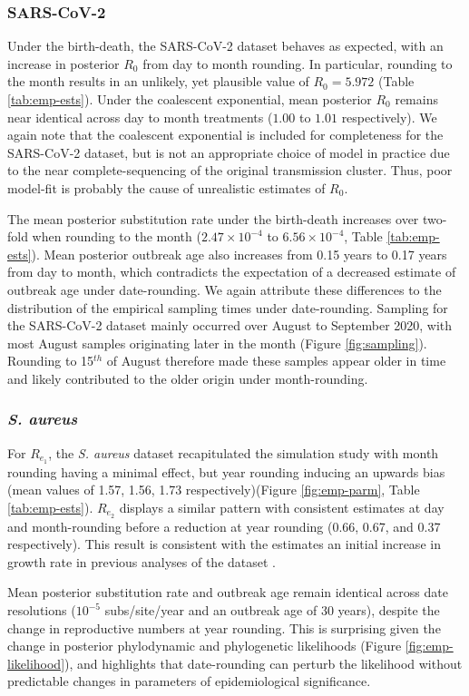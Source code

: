 \documentclass[12pt]{article}
\begin{document}
\begin{spacing}{2}
\subsubsection*{SARS-CoV-2}
Under the birth-death, the SARS-CoV-2 dataset behaves as expected, with an increase in posterior $R_0$ from day to month rounding. In particular, rounding to the month results in an unlikely, yet plausible value of $R_0 = 5.972$ (Table \ref{tab:emp-ests}). Under the coalescent exponential, mean posterior $R_0$ remains near identical across day to month treatments ($1.00$ to $1.01$ respectively). We again note that the coalescent exponential is included for completeness for the SARS-CoV-2 dataset, but is not an appropriate choice of model in practice due to the near complete-sequencing of the original transmission cluster. Thus, poor model-fit is probably the cause of unrealistic estimates of $R_0$.

The mean posterior substitution rate under the birth-death increases over two-fold when rounding to the month ($2.47\times10^{-4}$ to $6.56\times10^{-4}$, Table \ref{tab:emp-ests}). Mean posterior outbreak age also increases from 0.15 years to 0.17 years from day to month, which contradicts the expectation of a decreased estimate of outbreak age under date-rounding. We again attribute these differences to the distribution of the empirical sampling times under date-rounding. Sampling for the SARS-CoV-2 dataset mainly occurred over August to September 2020, with most August samples originating later in the month (Figure \ref{fig:sampling}). Rounding to 15$^{th}$ of August therefore made these samples appear older in time and likely contributed to the older origin under month-rounding.

\subsubsection*{\textit{S. aureus}}
For $R_{e_1}$, the \textit{S. aureus} dataset recapitulated the simulation study with month rounding having a minimal effect, but year rounding inducing an upwards bias (mean values of 1.57, 1.56, 1.73 respectively)(Figure \ref{fig:emp-parm}, Table \ref{tab:emp-ests}). $R_{e_2}$ displays a similar pattern with consistent estimates at day and month-rounding before a reduction at year rounding (0.66, 0.67, and 0.37 respectively). This result is consistent with the estimates an initial increase in growth rate in previous analyses of the dataset \cite{volz_modeling_2018}.

Mean posterior substitution rate and outbreak age remain identical across date resolutions ($10^{-5}$ subs/site/year and an outbreak age of 30 years), despite the change in reproductive numbers at year rounding. This is surprising given the change in posterior phylodynamic and phylogenetic likelihoods (Figure \ref{fig:emp-likelihood}), and highlights that date-rounding can perturb the likelihood without predictable changes in parameters of epidemiological significance.


\end{spacing}
\end{document}

